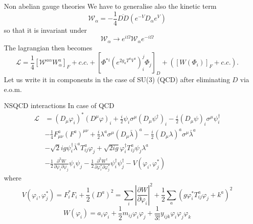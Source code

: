 \documentclass[10pt]{beamer}
\begin{document}
\begin{frame}{Non abelian gauge theories}
We have to generalise also the kinetic term 
\begin{equation*}
    \mathcal{W}_{\alpha}=-\frac{1}{4} \overline{D D}\left(e^{-V} D_{\alpha} e^{V}\right)
\end{equation*}
so that it is invariant under 
\begin{equation*}
    \mathcal{W}_{\alpha} \rightarrow e^{i \Omega} \mathcal{W}_{\alpha} e^{-i \Omega}
\end{equation*}
The lagrangian then becomes 
\begin{equation*}
    \mathcal{L}=\frac{1}{4}\left[\mathcal{W}^{a \alpha} W_{\alpha}^{a}\right]_{F}+c . c .+\left[\Phi^{*i}\left(e^{2 g_a T^{a} V^{a}}\right)_{i}^j \Phi_{j}\right]_{D}+\left(\left[W\left(\Phi_{i}\right)\right]_F+c . c .\right) .
\end{equation*}
Let us write it in components in the case of SU(3) (QCD) after eliminating $D$ via e.o.m.
\end{frame}

\begin{frame}{NSQCD interactions}
In case of QCD
\begin{equation*}
    \begin{aligned}
        \mathcal{L} &=\left(D_{\mu} \varphi_{i}\right)^{*}\left(D^{\mu} \varphi\right)_{i}+\frac{i}{2} \psi_{i} \sigma^{\mu}\left(D_{\mu} \psi^{\dagger}\right)_{i}-\frac{i}{2}\left(D_{\mu} \psi\right)_{i} \sigma^{\mu} \psi^{\dagger}_{i}\\
        &-\frac{1}{4} F_{\mu \nu}^{a}\left(F^{a}\right)^{\mu \nu}+\frac{i}{2} \lambda^{a} \sigma^{\mu}\left(D_{\mu} \bar{\lambda}\right)^{a}-\frac{i}{2}\left(D_{\mu} \lambda\right)^{a} \sigma^{\mu} \bar{\lambda}^{a} \\
        &-\sqrt{2} i g \psi^{\dagger}_{i} \bar{\lambda}^{a} T_{i j}^{a} \varphi_{j}+\sqrt{2 i g} \varphi_{i}^{\dagger} T_{i j}^{a} \psi_{j} \lambda^{a} \\
        &-\frac{1}{2} \frac{\partial^{2} W}{\partial \varphi_{i} \partial \varphi_{j}} \psi_{i} \psi_{j}-\frac{1}{2} \frac{\partial^{2} W^{\dagger}}{\partial \varphi_{i}^{*} \partial \varphi_{j}^{*}} \psi^{\dagger}_{i} \psi^{\dagger}_{j}-V\left(\varphi_{i}, \varphi_{j}^{*}\right)
        \end{aligned}
\end{equation*}
where 
\begin{equation*}
    V\left(\varphi_{i}, \varphi_{j}^{*}\right)=F_{i}^{*} F_{i}+\frac{1}{2}\left(D^{a}\right)^{2}=\sum_{i}\left|\frac{\partial W}{\partial \varphi_{i}}\right|^{2}+\frac{1}{2} \sum_{a}\left(g \varphi_{i}^{*} T_{i j}^{a} \varphi_{j}+k^{a}\right)^{2}
\end{equation*}
\begin{equation*}
    W\left(\varphi_{i}\right)=a_{i} \varphi_{i}+\frac{1}{2} m_{i j} \varphi_{i} \varphi_{j}+\frac{1}{3 !} y_{i j k} \varphi_{i} \varphi_{j} \varphi_{k}
\end{equation*}
\end{frame}
\end{document}
